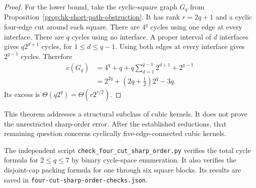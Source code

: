 \begin{proof}
For the lower bound, take the cyclic-square graph $G_q$ from Proposition~\ref{prop:hk-short-path-obstruction}.
It has rank $r=2q+1$ and a cyclic four-edge cut around each square.
There are $4^q$ cycles using one edge at every interface.
There are $q$ cycles using no interface.
A proper interval of $d$ interfaces gives $q2^{d+1}$ cycles, for $1\le d\le q-1$.
Using both edges at every interface gives $2^{q-1}$ cycles.
Therefore
\[
 \begin{split}
 c(G_q)
 &=4^q+q+q\sum_{d=1}^{q-1}2^{d+1}+2^{q-1}\\
 &=2^{2q}+\left(2q+\frac12\right)2^q-3q.
 \end{split}
\]
Its excess is $\Theta(q2^q)=\Theta(r2^{r/2})$.
\end{proof}

This theorem addresses a structural subclass of cubic kernels.
It does not prove the unrestricted sharp-order error.
After the established reductions, that remaining question concerns cyclically five-edge-connected cubic kernels.

The independent script \texttt{check\_four\_cut\_sharp\_order.py} verifies the total cycle formula for $2\le q\le7$ by binary cycle-space enumeration.
It also verifies the disjoint-cap packing formula for one through six square blocks.
Its results are saved in \texttt{four-cut-sharp-order-checks.json}.
